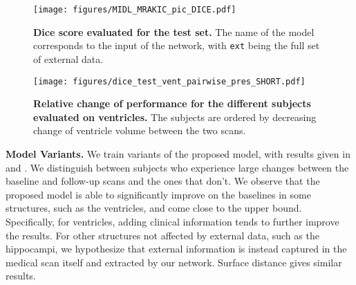 \documentclass{midl} %
\begin{document}
\begin{figure}
    \centering
    \vspace{-.4cm}
    \texttt{[image: figures/MIDL\_MRAKIC\_pic\_DICE.pdf]}
    \caption{\vspace{-0.5cm} 
    \textbf{Dice score evaluated for the test set.} The name of the model corresponds to the input of the network, with \texttt{ext} being the full set of external data.
    \vspace{-.3cm} }
    \label{fig:hist_results_no_atl}
\end{figure}


\begin{figure}
    \centering
    \vspace{-0.1cm}
    \texttt{[image: figures/dice\_test\_vent\_pairwise\_pres\_SHORT.pdf]}%
    \caption{\vspace{-0.6cm} 
    \textbf{Relative change of performance for the different subjects evaluated on ventricles.} The subjects are ordered by decreasing change of ventricle volume between the two scans.
    \vspace{-.7cm} }
    \label{fig:effect_decreases}
\end{figure}



\vspace{0.2cm}\noindent\textbf{Model Variants.} We train variants of the proposed model, with results given in  and .  We distinguish between subjects who experience large changes between the baseline and follow-up scans and the ones that don't. We observe that the proposed model is able to significantly improve on the baselines in some structures, such as the ventricles, and come close to the upper bound. Specifically, for ventricles, adding clinical information tends to further improve the results. 
For other structures not affected by external data, such as the hippocampi, we hypothesize that external information is instead captured in the medical scan itself and extracted by our network. Surface distance gives similar results.
\end{document}

